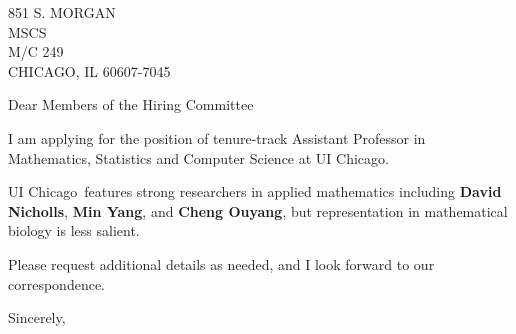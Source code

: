 




	
	
	\def\School{UI Chicago}
	
	\begin{letter}
		{851 S. MORGAN\\
			MSCS\\
			M/C 249\\
			CHICAGO, IL 60607-7045
			
		}
		
		\opening{Dear Members of the Hiring Committee}
		
		
		I am applying for the position of tenure-track Assistant Professor in Mathematics, Statistics and Computer Science  at \School. 
		
		\School~features strong researchers in applied mathematics including \textbf{David Nicholls}, \textbf{Min Yang}, and \textbf{Cheng Ouyang}, but representation in mathematical biology is less salient.  
		
		
		
		
		
		Please request additional details as needed, and I look forward to our correspondence.
		
		\closing{Sincerely,}
	\end{letter}
